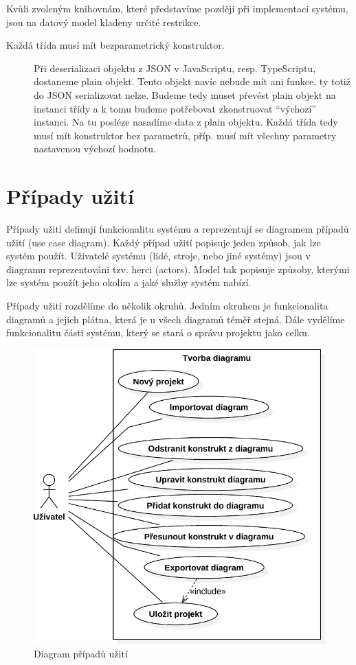 Kvůli zvoleným knihovnám, které představíme později při implementaci systému, jsou na datový model kladeny určité restrikce.
\begin{description}
  \item[Každá třída musí mít bezparametrický konstruktor.]
    Při deserializaci objektu z JSON v JavaScriptu, resp. TypeScriptu, dostaneme plain objekt.
    Tento objekt navíc nebude mít ani funkce, ty totiž do JSON serializovat nelze.
    Budeme tedy muset převést plain objekt na instanci třídy a k tomu budeme potřebovat zkonstruovat \enquote{výchozí} instanci.
    Na tu posléze nasadíme data z plain objektu.
    Každá třída tedy musí mít konstruktor bez parametrů, příp. musí mít všechny parametry nastavenou výchozí hodnotu.
  \item []
\end{description}

\section{Případy užití}

Případy užití definují funkcionalitu systému a reprezentují se diagramem případů užití (use case diagram).
Každý případ užití popisuje jeden způsob, jak lze systém použít.
Uživatelé systému (lidé, stroje, nebo jiné systémy) jsou v diagramu reprezentováni tzv. herci (actors).
Model tak popisuje způsoby, kterými lze systém použít jeho okolím a jaké služby systém nabízí.~\cite[s.~65]{overgaard_usecases_2005}

Případy užití rozdělíme do několik okruhů.
Jedním okruhem je funkcionalita diagramů a jejich plátna, která je u všech diagramů téměř stejná.
Dále vydělíme funkcionalitu části systému, který se stará o správu projektu jako celku.

\begin{figure}[!htb]
  \centering
  \includegraphics[width=\maxwidth{0.7\textwidth}]{../img/diagrams/use-case-diagram.pdf}
  \caption{Diagram případů užití}
  \label{fig:use-case-diagram}
\end{figure}
